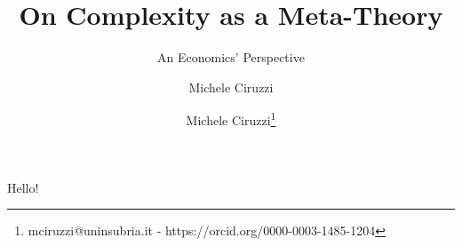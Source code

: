 \documentclass[a4paper, headings=standardclasses]{scrartcl}
\title{On Complexity as a Meta-Theory}
\subtitle{An Economics' Perspective}
\author{Michele Ciruzzi}
\author[1]{Michele Ciruzzi\thanks{mciruzzi@uninsubria.it - https://orcid.org/0000-0003-1485-1204}}
\begin{document}
	
	\maketitle
	
	
	\section{}
	Hello!
\end{document}
